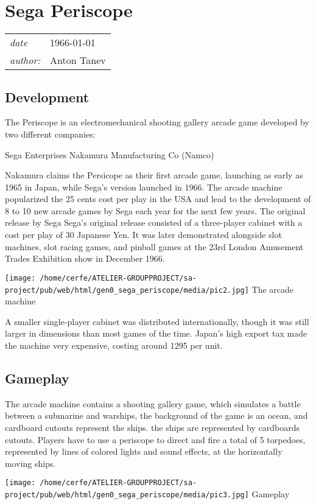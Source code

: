 \documentclass[a4paper,10pt]{book}
\newcommand{\pageHeader}[4]{
    \section{#1}
    \vspace{-0.3cm}
    \begin{table}[h!]
     \begin{tabular}{ll}
        \hline
        \textit{date} & #2 \\
        \textit{author: } & #3\\
        \hline
     \end{tabular}
    \end{table}
    \vspace{-0.3cm}
}
\begin{document}
 
 \newpage\pageHeader{Sega Periscope}{1966-01-01}{Anton Tanev}{A shooting gallery game, simutlating a submarine attacking warships}
 \subsection{Development }
 
        The Periscope is an electromechanical shooting gallery arcade game developed by two different companies:
         
 Sega Enterprises 
 Nakamura Manufacturing Co (Namco) 
 
        Nakamura claims the Persicope as their first arcade game, launching as early as 1965 in Japan, while Sega's version launched
        in 1966. The arcade machine popularized the 25 cents cost per play in the USA and lead to the development of 8 to 10 new arcade
        games by Sega each year for the next few years.  The original release by Sega Sega's original release  consisted of a three-player cabinet with a cost
        per play of 30 Japanese Yen. It was later demonstrated alongside slot machines, slot racing games, and pinball games at the
        23rd London Amusement Trades Exhibition show in December 1966.
         
 
 
 \texttt{[image: /home/cerfe/ATELIER-GROUPPROJECT/sa-project/pub/web/html/gen0\_sega\_periscope/media/pic2.jpg]}
 The arcade machine 
 
 
        A smaller single-player cabinet was distributed internationally, though it was still larger in dimensions than most games of the
        time. Japan's high export tax made the machine very expensive, costing around 1295 per unit.
         \subsection{Gameplay }
 
        The arcade machine contains a shooting gallery game, which simulates a battle between a submarine and warships, the background of the game
        is an ocean, and cardboard cutouts represent the ships.  the ships are represented by cardboards cutouts.  Players have to use a periscope to direct and fire a total of 5 torpedoes, represented
        by lines of colored lights and sound effects, at the horizontally moving ships.
         
 
 
 \texttt{[image: /home/cerfe/ATELIER-GROUPPROJECT/sa-project/pub/web/html/gen0\_sega\_periscope/media/pic3.jpg]}
 Gameplay 
 
\end{document}
